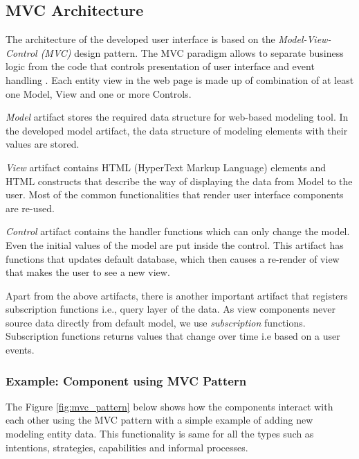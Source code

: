\subsection{MVC Architecture}
\label{subsec:mvcarch}
The architecture of the developed user interface is based on the \textit{Model-View-Control (MVC)} design pattern. The MVC paradigm allows to separate business logic from the code that controls presentation of user interface and event handling \cite{Oracle2016}. Each entity view in the web page is made up of combination of at least one Model, View and one or more Controls. 

\textit{Model} artifact stores the required data structure for web-based modeling tool. In the developed model artifact, the data structure of modeling elements with their values are stored. 

\textit{View} artifact contains HTML (HyperText Markup Language) elements and HTML constructs that describe the way of displaying the data from Model to the user. Most of the common functionalities that render user interface components are re-used. 

\textit{Control} artifact contains the handler functions which can only change the model. Even the initial values of the model are put inside the control. This artifact has functions that updates default database, which then causes a re-render of view that makes the user to see a new view.

Apart from the above artifacts, there is another important artifact that registers subscription functions i.e., query layer of the data. As view components never source data directly from default model, we use \textit{subscription} functions. Subscription functions returns values that change over time i.e based on a user events.

\subsubsection{Example: Component using MVC Pattern }
The Figure \ref{fig:mvc_pattern} below shows how the components interact with each other using the MVC pattern with a simple example of adding new modeling entity data. This functionality is same for all the types such as intentions, strategies, capabilities and informal processes.  

